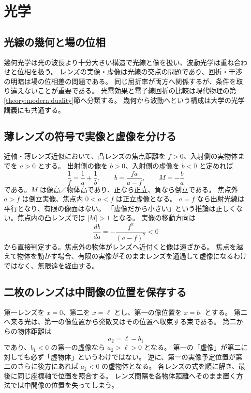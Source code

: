 \chapter{光学}
\section{光線の幾何と場の位相}
幾何光学は光の波長より十分大きい構造で光線と像を扱い、波動光学は重ね合わせと位相を扱う。
レンズの実像・虚像は光線の交点の問題であり、回折・干渉の明暗は場の位相差の問題である。
同じ屈折率が両方へ関係するが、条件を取り違えないことが重要である。
光電効果と電子線回折の比較は現代物理の第\ref{theory:modern:duality}節へ分類する。
幾何から波動へという構成は大学の光学講義にも共通する\cite{mit_optics2014}。

\section{薄レンズの符号で実像と虚像を分ける}\label{theory:optics:lens}
近軸・薄レンズ近似において、凸レンズの焦点距離を \(f>0\)、入射側の実物体までを \(a>0\) とする。
出射側の像を \(b>0\)、入射側の虚像を \(b<0\) と定めれば
\[
 \frac1f=\frac1a+\frac1b,\qquad b=\frac{fa}{a-f},\qquad M=-\frac ba
\]
である。\(M\) は像高／物体高であり、正なら正立、負なら倒立である。
焦点外 \(a>f\) は倒立実像、焦点内 \(0<a<f\) は正立虚像となる。
\(a=f\) なら出射光線は平行となり、有限の像面はない\cite{os_lens}。
「虚像だから小さい」という推論は正しくない。焦点内の凸レンズでは \(|M|>1\) となる。
実像の移動方向は
\[
 \frac{db}{da}=-\frac{f^2}{(a-f)^2}<0
\]
から直接判定する。焦点外の物体がレンズへ近付くと像は遠ざかる。
焦点を越えて物体を動かす場合、有限の実像がそのままレンズを通過して虚像になるわけではなく、無限遠を経由する。

\section{二枚のレンズは中間像の位置を保存する}\label{theory:optics:cascade}
第一レンズを \(x=0\)、第二を \(x=\ell\) とし、第一の像位置を \(x=b_1\) とする。
第二へ来る光は、第一の像位置から発散又はその位置へ収束する束である。
第二からの物体距離は
\[
 a_2=\ell-b_1
\]
であり、\(b_1<0\) の第一の虚像なら \(a_2>\ell>0\) となる。
第一の「虚像」が第二に対しても必ず「虚物体」というわけではない。
逆に、第一の実像予定位置が第二のさらに後方にあれば \(a_2<0\) の虚物体となる。
各レンズの式を順に解き、最後に同じ座標軸で位置を照合する。
レンズ間隔を各物体距離へそのまま置く方法では中間像の位置を失ってしまう。

